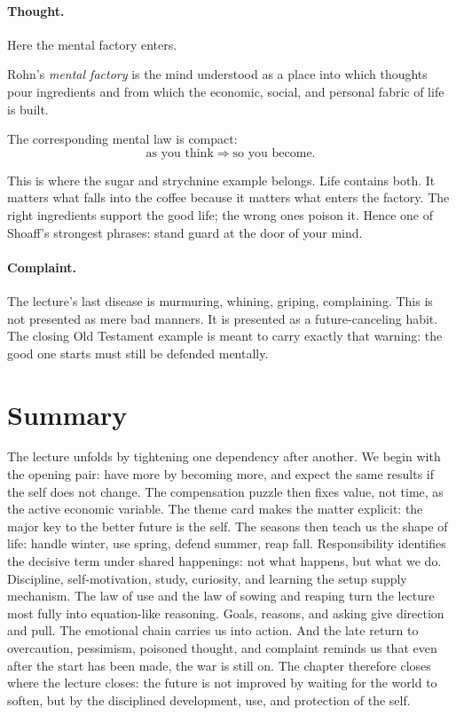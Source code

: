 \paragraph{Thought.} Here the mental factory enters.

\begin{definition}
Rohn's \emph{mental factory} is the mind understood as a place into which thoughts pour ingredients and from which the economic, social, and personal fabric of life is built.
\end{definition}

The corresponding mental law is compact:
\begin{equation}
\text{as you think} \Rightarrow \text{so you become}.
\end{equation}

This is where the sugar and strychnine example belongs. Life contains both. It matters what falls into the coffee because it matters what enters the factory. The right ingredients support the good life; the wrong ones poison it. Hence one of Shoaff's strongest phrases: stand guard at the door of your mind.

\paragraph{Complaint.} The lecture's last disease is murmuring, whining, griping, complaining. This is not presented as mere bad manners. It is presented as a future-canceling habit. The closing Old Testament example is meant to carry exactly that warning: the good one starts must still be defended mentally.

\section{Summary}

The lecture unfolds by tightening one dependency after another. We begin with the opening pair: have more by becoming more, and expect the same results if the self does not change. The compensation puzzle then fixes value, not time, as the active economic variable. The theme card makes the matter explicit: the major key to the better future is the self. The seasons then teach us the shape of life: handle winter, use spring, defend summer, reap fall. Responsibility identifies the decisive term under shared happenings: not what happens, but what we do. Discipline, self-motivation, study, curiosity, and learning the setup supply mechanism. The law of use and the law of sowing and reaping turn the lecture most fully into equation-like reasoning. Goals, reasons, and asking give direction and pull. The emotional chain carries us into action. And the late return to overcaution, pessimism, poisoned thought, and complaint reminds us that even after the start has been made, the war is still on. The chapter therefore closes where the lecture closes: the future is not improved by waiting for the world to soften, but by the disciplined development, use, and protection of the self.